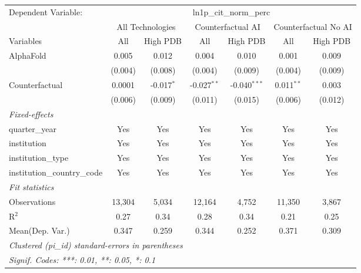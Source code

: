 \begingroup
\centering
\begin{tabular}{lcccccc}
   \tabularnewline \midrule \midrule
   Dependent Variable: & \multicolumn{6}{c}{ln1p\_cit\_norm\_perc}\\
 & \multicolumn{2}{c}{All Technologies} & \multicolumn{2}{c}{Counterfactual AI} & \multicolumn{2}{c}{Counterfactual No AI} \\
\cmidrule(lr){1-1}\cmidrule(lr){2-3} \cmidrule(lr){4-5} \cmidrule(lr){6-7}
Variables & \multicolumn{1}{c}{All} & \multicolumn{1}{c}{High PDB} & \multicolumn{1}{c}{All} & \multicolumn{1}{c}{High PDB} & \multicolumn{1}{c}{All} & \multicolumn{1}{c}{High PDB} \\
\cmidrule(lr){1-1}\cmidrule(lr){2-2} \cmidrule(lr){3-3} \cmidrule(lr){4-4} \cmidrule(lr){5-5} \cmidrule(lr){6-6} \cmidrule(lr){7-7}
   AlphaFold                    & 0.005   & 0.012        & 0.004         & 0.010          & 0.001        & 0.009\\   
                                & (0.004) & (0.008)      & (0.004)       & (0.009)        & (0.004)      & (0.009)\\   
   Counterfactual               & 0.0001  & -0.017$^{*}$ & -0.027$^{**}$ & -0.040$^{***}$ & 0.011$^{**}$ & 0.003\\   
                                & (0.006) & (0.009)      & (0.011)       & (0.015)        & (0.006)      & (0.012)\\   
   \midrule
   \emph{Fixed-effects}\\
   quarter\_year                & Yes     & Yes          & Yes           & Yes            & Yes          & Yes\\  
   institution                  & Yes     & Yes          & Yes           & Yes            & Yes          & Yes\\  
   institution\_type            & Yes     & Yes          & Yes           & Yes            & Yes          & Yes\\  
   institution\_country\_code   & Yes     & Yes          & Yes           & Yes            & Yes          & Yes\\  
   \midrule
   \emph{Fit statistics}\\
   Observations                 & 13,304  & 5,034        & 12,164        & 4,752          & 11,350       & 3,867\\  
   R$^2$                        & 0.27    & 0.34         & 0.28          & 0.34           & 0.21         & 0.25\\  
Mean(Dep. Var.) & 0.347 & 0.259 & 0.344 & 0.252 & 0.371 & 0.309 \\
   \midrule \midrule
   \multicolumn{7}{l}{\emph{Clustered (pi\_id) standard-errors in parentheses}}\\
   \multicolumn{7}{l}{\emph{Signif. Codes: ***: 0.01, **: 0.05, *: 0.1}}\\
\end{tabular}
\par\endgroup
